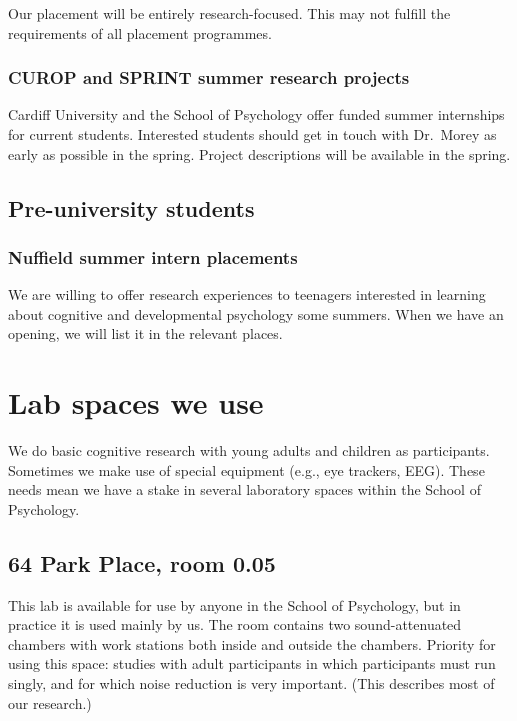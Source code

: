\documentclass[12pt,]{book}
\theoremstyle{definition}
\theoremstyle{definition}
\theoremstyle{definition}
\theoremstyle{remark}
\begin{document}
Our placement will be entirely research-focused. This may not fulfill
the requirements of all placement programmes.

\subsection{CUROP and SPRINT summer research
projects}\label{curop-and-sprint-summer-research-projects}

Cardiff University and the School of Psychology offer funded summer
internships for current students. Interested students should get in
touch with Dr.~Morey as early as possible in the spring. Project
descriptions will be available in the spring.

\section{Pre-university students}\label{pre-university-students}

\subsection{Nuffield summer intern
placements}\label{nuffield-summer-intern-placements}

We are willing to offer research experiences to teenagers interested in
learning about cognitive and developmental psychology some summers. When
we have an opening, we will list it in the relevant places.

\chapter{Lab spaces we use}\label{lab-spaces-we-use}

We do basic cognitive research with young adults and children as
participants. Sometimes we make use of special equipment (e.g., eye
trackers, EEG). These needs mean we have a stake in several laboratory
spaces within the School of Psychology.

\section{64 Park Place, room 0.05}\label{park-place-room-0.05}

This lab is available for use by anyone in the School of Psychology, but
in practice it is used mainly by us. The room contains two
sound-attenuated chambers with work stations both inside and outside the
chambers. Priority for using this space: studies with adult participants
in which participants must run singly, and for which noise reduction is
very important. (This describes most of our research.)
\end{document}
